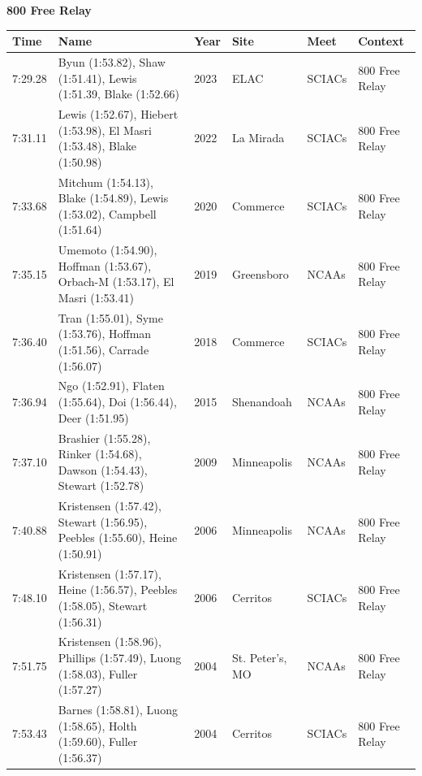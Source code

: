\noindent\begin{minipage}[t]{0.98\textwidth}
\centering
\textbf{\textcolor{teamprimary}{800 Free Relay}}\par
\vspace{0.5em}
\centering
\small
\renewcommand{\arraystretch}{1.0}
\setlength{\tabcolsep}{4pt}
\begin{tabular}{@{}p{2.0cm}p{3.2cm}p{1.2cm}p{2.0cm}p{2.0cm}p{2.5cm}@{}}
\toprule
\textbf{Time} & \textbf{Name} & \textbf{Year} & \textbf{Site} & \textbf{Meet} & \textbf{Context} \\
\midrule
7:29.28 & Byun (1:53.82), Shaw (1:51.41), Lewis (1:51.39, Blake (1:52.66) & 2023 & ELAC & SCIACs & 800 Free Relay \\
7:31.11 & Lewis (1:52.67), Hiebert (1:53.98), El Masri (1:53.48), Blake (1:50.98) & 2022 & La Mirada & SCIACs & 800 Free Relay \\
7:33.68 & Mitchum (1:54.13), Blake (1:54.89), Lewis (1:53.02), Campbell (1:51.64) & 2020 & Commerce & SCIACs & 800 Free Relay \\
7:35.15 & Umemoto (1:54.90), Hoffman (1:53.67), Orbach-M (1:53.17), El Masri (1:53.41) & 2019 & Greensboro & NCAAs & 800 Free Relay \\
7:36.40 & Tran (1:55.01), Syme (1:53.76), Hoffman (1:51.56), Carrade (1:56.07) & 2018 & Commerce & SCIACs & 800 Free Relay \\
7:36.94 & Ngo (1:52.91), Flaten (1:55.64), Doi (1:56.44), Deer (1:51.95) & 2015 & Shenandoah & NCAAs & 800 Free Relay \\
7:37.10 & Brashier (1:55.28), Rinker (1:54.68), Dawson (1:54.43), Stewart (1:52.78) & 2009 & Minneapolis & NCAAs & 800 Free Relay \\
7:40.88 & Kristensen (1:57.42), Stewart (1:56.95), Peebles (1:55.60), Heine (1:50.91) & 2006 & Minneapolis & NCAAs & 800 Free Relay \\
7:48.10 & Kristensen (1:57.17), Heine (1:56.57), Peebles (1:58.05), Stewart (1:56.31) & 2006 & Cerritos & SCIACs & 800 Free Relay \\
7:51.75 & Kristensen (1:58.96), Phillips (1:57.49), Luong (1:58.03), Fuller (1:57.27) & 2004 & St. Peter's, MO & NCAAs & 800 Free Relay \\
7:53.43 & Barnes (1:58.81), Luong (1:58.65), Holth (1:59.60), Fuller (1:56.37) & 2004 & Cerritos & SCIACs & 800 Free Relay \\
\bottomrule
\end{tabular}
\end{minipage}
\vspace{1.2em}
